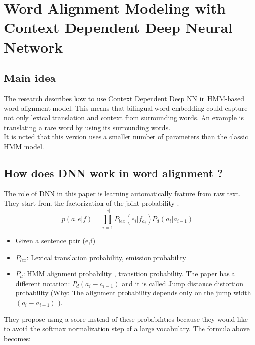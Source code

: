 \documentclass{article}
\begin{document}

\section{Word Alignment Modeling with Context Dependent Deep Neural Network \citep{Yang13word}}

\subsection{Main idea}
The research describes how to use Context Dependent Deep NN in HMM-based word alignment model. This means that bilingual word embedding could capture not only lexical translation and context from surrounding words.
An example is translating a rare word by using its surrounding words.\\
It is noted that this version uses a smaller number of parameters than the classic HMM model.

\subsection{How does DNN work in word alignment ?}
The role of DNN in this paper is learning automatically feature from raw text.
They start from the factorization of the joint probability \cite{Vogel1996HMM}.
\begin{equation}
p(a, e| f) = \prod_{i = 1}^{|e|} P_{lex}(e_{i}|f_{a_{i}}) P_{d}(a_{i}|a_{i-1})
\end{equation}
	\begin{itemize}
	\item Given a sentence pair (e,f) 
	\item $P_{lex}$: Lexical translation probability, emission probability
	\item $P_{d}$: HMM alignment probability \cite{Vogel1996HMM}, transition probability. The paper has a different notation: $P_{d}(a_{i} - a_{i-1})$ and it is called Jump distance distortion probability (Why: The alignment probability depends only on the jump width $(a_{i} - a_{i-1})$ \cite{Vogel1996HMM}).
	\end{itemize}

They propose using a score instead of these probabilities because they would like to avoid the softmax normalization step of a large vocabulary. The formula above becomes:
\end{document}
